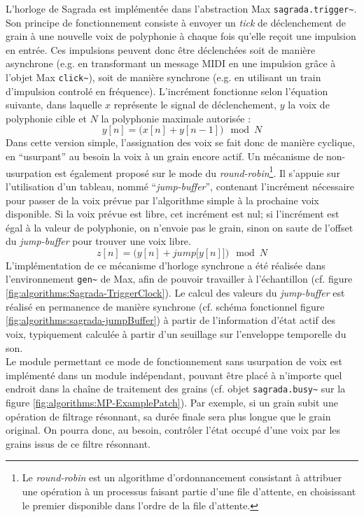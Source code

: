 \noindent L'horloge de Sagrada est implémentée dans l'abstraction Max \verb|sagrada.trigger~|. Son principe de fonctionnement consiste à envoyer un \textit{tick} de déclenchement de grain à une nouvelle voix de polyphonie à chaque fois qu'elle reçoit une impulsion en entrée. Ces impulsions peuvent donc être déclenchées soit de manière asynchrone (e.g. en transformant un message \gls{MIDI} en une impulsion grâce à l'objet Max \verb|click~|), soit de manière synchrone (e.g. en utilisant un train d'impulsion controlé en fréquence). L'incrément fonctionne selon l'équation suivante, dans laquelle $x$ représente le signal de déclenchement, $y$ la voix de polyphonie cible et $N$ la polyphonie maximale autorisée :
$$ y[n] = \big(x[n] + y[n - 1]\big) \mod N $$
\noindent Dans cette version simple, l'assignation des voix se fait donc de manière cyclique, en ``usurpant'' au besoin la voix à un grain encore actif. Un mécanisme de non-usurpation est également proposé sur le mode du \textit{round-robin}\footnote{Le \textit{round-robin} est un algorithme d'ordonnancement consistant à attribuer une opération à un processus faisant partie d'une file d'attente, en choisissant le premier disponible dans l'ordre de la file d'attente.}. Il s'appuie sur l'utilisation d'un tableau, nommé ``\textit{jump-buffer}'', contenant l'incrément nécessaire pour passer de la voix prévue par l'algorithme simple à la prochaine voix disponible. Si la voix prévue est libre, cet incrément est nul; si l'incrément est égal à la valeur de polyphonie, on n'envoie pas le grain, sinon on saute de l'offset du \textit{jump-buffer }pour trouver une voix libre.
$$ z[n] = \Big(y[n] + jump\big[y[n]\big]\Big)\mod N $$
\noindent L'implémentation de ce mécanisme d'horloge synchrone a été réalisée dans l'environnement \verb|gen~| de Max, afin de pouvoir travailler à l'échantillon (cf. figure \ref{fig:algorithms:Sagrada-TriggerClock}). Le calcul des valeurs du \textit{jump-buffer} est réalisé en permanence de manière synchrone (cf. schéma fonctionnel figure \ref{fig:algorithms:sagrada-jumpBuffer}) à partir de l'information d'état actif des voix, typiquement calculée à partir d'un seuillage sur l'enveloppe temporelle du son.\\
\indent Le module permettant ce mode de fonctionnement sans usurpation de voix est implémenté dans un module indépendant, pouvant être placé à n'importe quel endroit dans la chaîne de traitement des grains (cf. objet \verb|sagrada.busy~| sur la figure \ref{fig:algorithms:MP-ExamplePatch}). Par exemple, si un grain subit une opération de filtrage résonnant, sa durée finale sera plus longue que le grain original. On pourra donc, au besoin, contrôler l'état occupé d'une voix par les grains issus de ce filtre résonnant.

